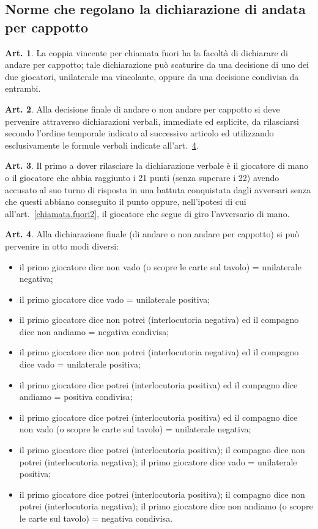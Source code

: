 \documentclass[italian,a4paper]{book}
\theoremstyle{definition}
\newtheorem{art}{Art.}
\newenvironment{packeditem}{
\begin{itemize}
  \setlength{\itemsep}{1pt}
  \setlength{\parskip}{0pt}
  \setlength{\parsep}{0pt}
}{\end{itemize}}
\begin{document}
\subsection{Norme che regolano la dichiarazione di andata per cappotto}
\begin{art}\label{cappotto1}
La coppia vincente per chiamata fuori ha la facoltà di dichiarare di andare per cappotto; tale dichiarazione può scaturire da una decisione di uno dei due giocatori, unilaterale ma vincolante, oppure da una decisione condivisa da entrambi.
\end{art}
\begin{art}
Alla decisione finale di andare o non andare per cappotto si deve pervenire
attraverso dichiarazioni verbali, immediate ed esplicite, da rilasciarsi
secondo l'ordine temporale indicato al successivo articolo ed utilizzando
esclusivamente le formule verbali indicate all'art.~\ref{cappotto2}. 
\end{art}
\begin{art}\label{cappotto}
Il primo a dover rilasciare la dichiarazione verbale è il giocatore di mano
o il giocatore che abbia raggiunto i 21 punti (senza superare i 22) avendo
accusato al suo turno di risposta in una battuta conquistata dagli avversari
senza che questi abbiano conseguito il punto oppure, nell'ipotesi di cui
all'art.~\ref{chiamata.fuori2}, il giocatore che segue di giro l'avversario di mano.
\end{art}
\begin{art}\label{cappotto2}
Alla dichiarazione finale (di andare o non andare per cappotto) si può pervenire in otto modi diversi:
\begin{packeditem}
\item    il primo giocatore dice non vado (o scopre le carte sul tavolo) = unilaterale negativa;
\item    il primo giocatore dice vado = unilaterale positiva;
\item    il primo giocatore dice non potrei (interlocutoria negativa) ed il compagno dice non andiamo  = negativa condivisa;
\item    il primo giocatore dice non potrei  (interlocutoria negativa) ed il compagno dice vado = unilaterale positiva;
\item    il primo giocatore dice potrei (interlocutoria positiva) ed il compagno dice andiamo = positiva condivisa;
\item    il primo giocatore dice potrei (interlocutoria positiva) ed il compagno dice non vado (o scopre le carte sul tavolo) = unilaterale negativa;
\item    il primo giocatore dice potrei (interlocutoria positiva); il compagno dice non potrei  (interlocutoria negativa); il primo giocatore dice vado = unilaterale positiva;
\item    il primo giocatore dice potrei (interlocutoria positiva); il compagno dice non potrei  (interlocutoria negativa); il primo giocatore dice non andiamo (o scopre le carte sul tavolo) = negativa condivisa.
    \end{packeditem}
\end{art}
\end{document}
